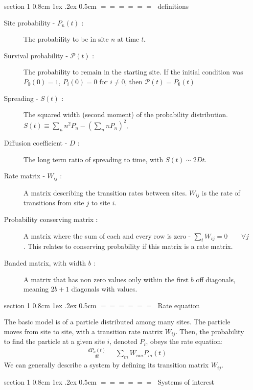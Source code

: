 \documentclass[onecolumn,fleqn,notitlepage,secnumarabic]{revtex4}
\makeatletter
\def\section{%
  \@startsection
    {section}%
    {1}%
    {\z@}%
    {0.8cm \@plus1ex \@minus .2ex}%
    {0.5cm}%
    {\Large\bf $=\!=\!=\!=\!=\!=\;$}%
}%
\makeatother
\begin{document}
\section{definitions}\label{sec:definitions}
\begin{description}
    \item[Site probability - $P_n(t)$ : ] The probability to be in site $n$ at time $t$.
    \item[Survival probability - $\mathcal{P}(t)$ : ] The probability to remain in the starting site. If the initial condition was $P_0(0)=1$, $P_i(0)=0 \textrm{  for  } i\neq 0$, then $\mathcal{P}(t)= P_0(t)$
    \item[Spreading - $S(t)$ : ] The squared width (second moment) of the probability distribution. $S(t) \equiv \sum_n n^2 P_n -\left(\sum_n n P_n\right)^2$. 
    \item[Diffusion coefficient - $D$ : ] The long term ratio of spreading to time, with $S(t) \sim 2Dt$.
    \item[Rate matrix - $W_{ij}$ : ] A matrix describing the transition rates between sites. $W_{ij}$ is the rate of transitions from site $j$ to site $i$.
    \item[Probability conserving matrix : ]\label{def:prob_conserv} A matrix where the sum of each and every row is zero - $\sum_i W_{ij} = 0 \qquad \forall j$. This relates to conserving probability if this matrix is a rate matrix.
    \item[Banded matrix, with width $b$ : ] A matrix that has non zero values only within the first $b$ off diagonals, meaning $2b+1$ diagonals with values.
\end{description}


\section{Rate equation}

The basic model is of a particle distributed among many sites. The particle moves from site to site, with a transition rate matrix $W_{ij}$. Then, the probability to find the particle at a given site $i$, denoted $P_i$, obeys the rate equation:
\begin{align}
\frac{dP_n(t)}{dt} = \sum_m W_{nm}P_m(t)
\end{align}
We can generally describe a system by defining its transition matrix $W_{ij}$.

\section{Systems of interest}
\end{document}
